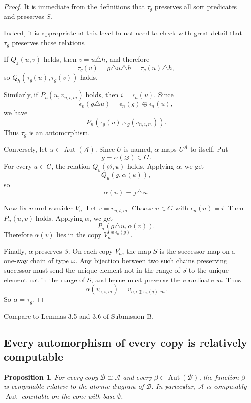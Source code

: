 \documentclass[12pt]{article}
\newtheorem{proposition}{Proposition}
\newcommand{\Aut}{\operatorname{Aut}}
\newcommand{\review}[1]{\begin{reviewbox}#1\end{reviewbox}}
\begin{document}
\begin{proof}
It is immediate from the definitions that $\tau_g$ preserves all sort predicates and preserves $S$.

\review{Indeed, it is appropriate at this level to not need to check with great detail that $\tau_g$ preserves those relations.}

If $Q_h(u,v)$ holds, then $v=u\triangle h$, and therefore
\[
\tau_g(v)=g\triangle u\triangle h=\tau_g(u)\triangle h,
\]
so $Q_h(\tau_g(u),\tau_g(v))$ holds.

Similarly, if $P_n(u,v_{n,i,m})$ holds, then $i=\epsilon_n(u)$.  Since
\[
\epsilon_n(g\triangle u)=\epsilon_n(g)\oplus\epsilon_n(u),
\]
we have
\[
P_n(\tau_g(u),\tau_g(v_{n,i,m})).
\]
Thus $\tau_g$ is an automorphism.

Conversely, let $\alpha\in\Aut(\mathcal A)$.  Since $U$ is named, $\alpha$ maps $U^{\mathcal A}$ to itself.  Put
\[
g=\alpha(\varnothing)\in G.
\]
For every $u\in G$, the relation $Q_u(\varnothing,u)$ holds.  Applying $\alpha$, we get
\[
Q_u(g,\alpha(u)),
\]
so
\[
\alpha(u)=g\triangle u.
\]

Now fix $n$ and consider $V_n$.  Let $v=v_{n,i,m}$.  Choose $u\in G$ with
$\epsilon_n(u)=i$.  Then $P_n(u,v)$ holds.  Applying $\alpha$, we get
\[
P_n(g\triangle u,\alpha(v)).
\]
Therefore $\alpha(v)$ lies in the copy $V_n^{i\oplus\epsilon_n(g)}$.

Finally, $\alpha$ preserves $S$.  On each copy $V_n^i$, the map $S$ is the successor map on a one-way chain of type $\omega$.  Any bijection between two such chains preserving successor must send the unique element not in the range of $S$ to the unique element not in the range of $S$, and hence must preserve the coordinate $m$.  Thus
\[
\alpha(v_{n,i,m})=v_{n,i\oplus\epsilon_n(g),m}.
\]
So $\alpha=\tau_g$.
\end{proof}

\review{Compare to Lemmas 3.5 and 3.6 of Submission B.}

\subsection*{Every automorphism of every copy is relatively computable}

\begin{proposition}
For every copy $\mathcal B\cong\mathcal A$ and every
$\beta\in\Aut(\mathcal B)$, the function $\beta$ is computable relative to
the atomic diagram of $\mathcal B$.  In particular, $\mathcal A$ is
computably $\Aut$-countable on the cone with base $\emptyset$.
\end{proposition}
\end{document}
